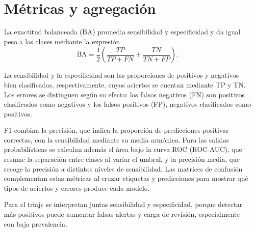 \section{Métricas y agregación}
\label{sec:metricas}

La exactitud balanceada (BA) promedia sensibilidad y especificidad y da igual peso a las clases mediante la expresión
\[
  \mathrm{BA}=\frac{1}{2}\left(\frac{TP}{TP+FN}+\frac{TN}{TN+FP}\right).
\]

La sensibilidad y la especificidad son las proporciones de positivos y negativos bien clasificados, respectivamente, cuyos aciertos se cuentan mediante TP y TN. Los errores se distinguen según su efecto: los falsos negativos (FN) son positivos clasificados como negativos y los falsos positivos (FP), negativos clasificados como positivos.

F1 combina la precisión, que indica la proporción de predicciones positivas correctas, con la sensibilidad mediante su media armónica. Para las salidas probabilísticas se calculan además el área bajo la curva ROC (ROC-AUC), que resume la separación entre clases al variar el umbral, y la precisión media, que recoge la precisión a distintos niveles de sensibilidad. Las matrices de confusión complementan estas métricas al cruzar etiquetas y predicciones para mostrar qué tipos de aciertos y errores produce cada modelo.

Para el triaje se interpretan juntas sensibilidad y especificidad, porque detectar más positivos puede aumentar falsas alertas y carga de revisión, especialmente con baja prevalencia.
